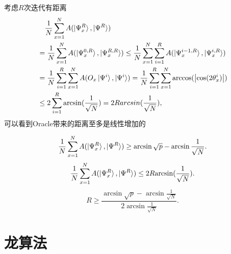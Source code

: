 \documentclass{beamer}
\begin{document}
\begin{frame}{}
    考虑$R$次迭代有距离
    \begin{equation*}
        \begin{split}
             & \quad\frac{1}{N}\sum_{x=1}^{N}{A}(\ket{\Psi_{x}^{R}},\ket{\Psi^{R}})                          \\
             & = \frac{1}{N}\sum_{x=1}^{N}{A}(\ket{\Psi_{x}^{0,R}},\ket{\Psi_{x}^{R,R}})
            \leq \frac{1}{N}\sum_{x=1}^{N}\sum_{i=1}^{R}{A}(\ket{\Psi_{x}^{i-1,R}},\ket{\Psi_{x}^{i,R}})     \\
             & = \frac{1}{N}\sum_{i=1}^{R}\sum_{x=1}^{N}{A}(O_{x}\ket{\Psi^{i}},\ket{\Psi^{i}})
            = \frac{1}{N}\sum_{i=1}^{R}\sum_{x=1}^{N}{\arccos(\left\lvert\cos(2\theta_{x}^{i})\right\rvert)} \\
             & \leq 2\sum_{i=1}^{R}{\arcsin(\frac{1}{\sqrt{N}})} = 2R{arcsin(\frac{1}{\sqrt{N}})},
        \end{split}
    \end{equation*}
    可以看到Oracle带来的距离至多是线性增加的
\end{frame}

\begin{frame}{}
    \begin{equation}
        \frac{1}{N}\sum_{x=1}^{N}A(\ket{\Psi_{x}^{R}},\ket{\Psi^{R}})\geq \arcsin\sqrt{p}-\arcsin\frac{1}{\sqrt{N}}.
    \end{equation}
    \begin{equation}
        \frac{1}{N}\sum_{x=1}^{N}{A}(\ket{\Psi_{x}^{R}},\ket{\Psi^{R}})\leq 2R{\arcsin(\frac{1}{\sqrt{N}})}.
    \end{equation}
    \begin{equation}
        R \geq\frac{\arcsin\sqrt{p}-\arcsin\frac{1}{\sqrt{N}}}{2\arcsin\frac{1}{\sqrt{N}}}.
    \end{equation}
\end{frame}



\section{龙算法}
\end{document}
